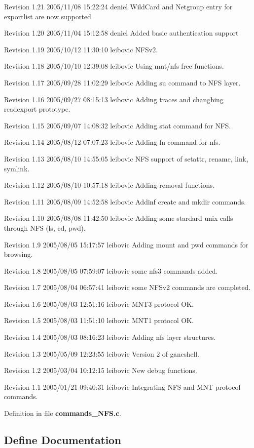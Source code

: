 Revision 1.21 2005/11/08 15:22:24 deniel Wild\-Card and Netgroup entry for exportlist are now supported

Revision 1.20 2005/11/04 15:12:58 deniel Added basic authentication support

Revision 1.19 2005/10/12 11:30:10 leibovic NFSv2.

Revision 1.18 2005/10/10 12:39:08 leibovic Using mnt/nfs free functions.

Revision 1.17 2005/09/28 11:02:29 leibovic Adding su command to NFS layer.

Revision 1.16 2005/09/27 08:15:13 leibovic Adding traces and changhing readexport prototype.

Revision 1.15 2005/09/07 14:08:32 leibovic Adding stat command for NFS.

Revision 1.14 2005/08/12 07:07:23 leibovic Adding ln command for nfs.

Revision 1.13 2005/08/10 14:55:05 leibovic NFS support of setattr, rename, link, symlink.

Revision 1.12 2005/08/10 10:57:18 leibovic Adding removal functions.

Revision 1.11 2005/08/09 14:52:58 leibovic Addinf create and mkdir commands.

Revision 1.10 2005/08/08 11:42:50 leibovic Adding some stardard unix calls through NFS (ls, cd, pwd).

Revision 1.9 2005/08/05 15:17:57 leibovic Adding mount and pwd commands for browsing.

Revision 1.8 2005/08/05 07:59:07 leibovic some nfs3 commands added.

Revision 1.7 2005/08/04 06:57:41 leibovic some NFSv2 commands are completed.

Revision 1.6 2005/08/03 12:51:16 leibovic MNT3 protocol OK.

Revision 1.5 2005/08/03 11:51:10 leibovic MNT1 protocol OK.

Revision 1.4 2005/08/03 08:16:23 leibovic Adding nfs layer structures.

Revision 1.3 2005/05/09 12:23:55 leibovic Version 2 of ganeshell.

Revision 1.2 2005/03/04 10:12:15 leibovic New debug functions.

Revision 1.1 2005/01/21 09:40:31 leibovic Integrating NFS and MNT protocol commands.

Definition in file {\bf commands\_\-NFS.c}.

\subsection{Define Documentation}
